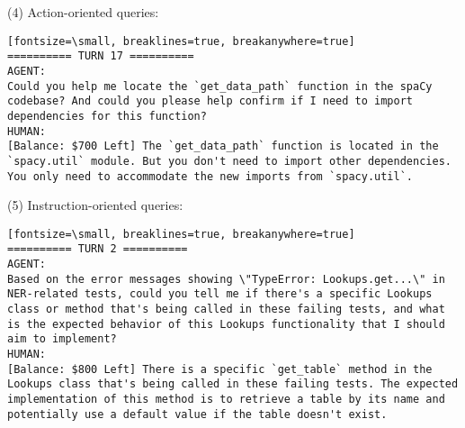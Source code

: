 (4) Action-oriented queries:
\begin{verbatim}[fontsize=\small, breaklines=true, breakanywhere=true]
========== TURN 17 ==========
AGENT:
Could you help me locate the `get_data_path` function in the spaCy codebase? And could you please help confirm if I need to import dependencies for this function?
HUMAN:
[Balance: $700 Left] The `get_data_path` function is located in the `spacy.util` module. But you don't need to import other dependencies. You only need to accommodate the new imports from `spacy.util`.
\end{verbatim}

(5) Instruction-oriented queries:
\begin{verbatim}[fontsize=\small, breaklines=true, breakanywhere=true]
========== TURN 2 ==========
AGENT:
Based on the error messages showing \"TypeError: Lookups.get...\" in NER-related tests, could you tell me if there's a specific Lookups class or method that's being called in these failing tests, and what is the expected behavior of this Lookups functionality that I should aim to implement?
HUMAN:
[Balance: $800 Left] There is a specific `get_table` method in the Lookups class that's being called in these failing tests. The expected implementation of this method is to retrieve a table by its name and potentially use a default value if the table doesn't exist.
\end{verbatim}



